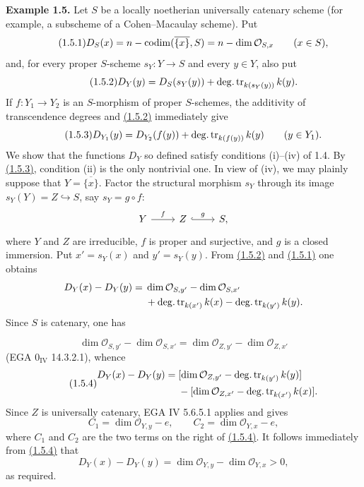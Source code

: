 \textbf{Example 1.5.}
Let $S$ be a locally noetherian universally catenary scheme (for example, a
subscheme of a Cohen--Macaulay scheme). Put
\begin{equation}\tag{1.5.1}
D_S(x)=n-\operatorname{codim}(\overline{\{x\}},S)
      =n-\dim\mathcal O_{S,x}\qquad(x\in S),
\end{equation}
and, for every proper $S$-scheme $s_Y:Y\to S$ and every $y\in Y$, also put
\begin{equation}\tag{1.5.2}
D_Y(y)=D_S(s_Y(y))+\operatorname{deg.tr}_{k(s_Y(y))}k(y).
\end{equation}
If $f:Y_1\to Y_2$ is an $S$-morphism of proper $S$-schemes, the additivity of
transcendence degrees and \hyperlink{sga6.e10.eq.1-5-2}{(1.5.2)} immediately give
\begin{equation}\tag{1.5.3}
D_{Y_1}(y)=D_{Y_2}(f(y))+\operatorname{deg.tr}_{k(f(y))}k(y)
\qquad(y\in Y_1).
\end{equation}
We show that the functions $D_Y$ so defined satisfy conditions (i)--(iv) of
1.4. By \hyperlink{sga6.e10.eq.1-5-3}{(1.5.3)}, condition (ii) is the only nontrivial one. In view of (iv),
we may plainly suppose that $Y=\overline{\{x\}}$. Factor the structural
morphism $s_Y$ through its image $s_Y(Y)=Z\hookrightarrow S$, say
$s_Y=g\circ f$:
\[
\begin{tikzcd}
Y \arrow[r,"f"] & Z \arrow[r,hook,"g"] & S,
\end{tikzcd}
\]
where $Y$ and $Z$ are irreducible, $f$ is proper and surjective, and $g$ is a
closed immersion. Put $x'=s_Y(x)$ and $y'=s_Y(y)$. From \hyperlink{sga6.e10.eq.1-5-2}{(1.5.2)} and \hyperlink{sga6.e10.eq.1-5-1}{(1.5.1)}
one obtains
\[
\begin{split}
D_Y(x)-D_Y(y)={}&\dim\mathcal O_{S,y'}-\dim\mathcal O_{S,x'}\\
&+\operatorname{deg.tr}_{k(x')}k(x)-\operatorname{deg.tr}_{k(y')}k(y).
\end{split}
\]
Since $S$ is catenary, one has

\[
\dim\mathcal O_{S,y'}-\dim\mathcal O_{S,x'}
=\dim\mathcal O_{Z,y'}-\dim\mathcal O_{Z,x'}
\]
(EGA $0_{\mathrm{IV}}$ 14.3.2.1), whence
\begin{equation}\tag{1.5.4}
\begin{split}
D_Y(x)-D_Y(y)={}&
[\dim\mathcal O_{Z,y'}-\operatorname{deg.tr}_{k(y')}k(y)]\\
&-[\dim\mathcal O_{Z,x'}-\operatorname{deg.tr}_{k(x')}k(x)].
\end{split}
\end{equation}
Since $Z$ is universally catenary, EGA IV 5.6.5.1 applies and gives
\[
C_1=\dim\mathcal O_{Y,y}-e,
\qquad
C_2=\dim\mathcal O_{Y,x}-e,
\]
where $C_1$ and $C_2$ are the two terms on the right of \hyperlink{sga6.e10.eq.1-5-4}{(1.5.4)}. It follows
immediately from \hyperlink{sga6.e10.eq.1-5-4}{(1.5.4)} that
\[
D_Y(x)-D_Y(y)
=\dim\mathcal O_{Y,y}-\dim\mathcal O_{Y,x}>0,
\]
as required.

